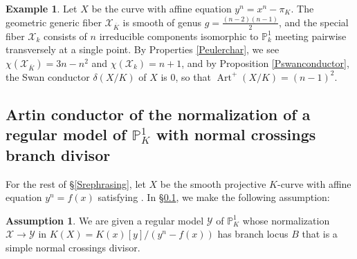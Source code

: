 \documentclass[12pt]{amsart}
\numberwithin{equation}{section}
\theoremstyle{definition}
\newtheorem{assumption}[equation]{Assumption}
\newtheorem{example}[equation]{Example}
\newcommand{\padma}[1]{{\color{Magenta} \sf $\clubsuit\clubsuit\clubsuit$ Padma: [#1]}}
\newcommand{\mc}[1]{\mathcal{#1}}
\renewcommand{\P}{\mathbb P}
\newcommand{\proj}{\mathbb P}
\renewcommand{\c}[1]{\overline{#1}}
\newcommand{\X}{\mathcal{X}}
\DeclareMathOperator{\Art}{Art}
\begin{document}

\begin{example}\label{example:optimal} Let $X$ be the curve with affine equation $y^n=x^n-\pi_K$. The geometric generic fiber $\X_{\c{K}}$ is smooth of genus $g=\frac{(n-2)(n-1)}{2}$, and the special fiber $\X_k$ consists of $n$ irreducible components isomorphic to $\P^1_k$ meeting pairwise transversely at a single point. By Properties \ref{Peulerchar}, we see $\chi(\X_{\c{K}})=3n-n^2$ and $\chi(\X_k)=n+1$, and by Proposition \ref{Pswanconductor}, the Swan conductor $\delta(X/K)$ of $X$ is $0$, so that $\Art^+(X/K)=(n-1)^2$. 
\end{example}


\subsection{Artin conductor of the normalization of a regular model of $\proj^1_K$
  with normal crossings branch divisor}\label{Sfirstartinformula}

For the rest of \S\ref{Srephrasing}, let $X$ be the smooth projective $K$-curve with affine
equation $y^n = f(x)$ satisfying .
In \S\ref{Sfirstartinformula}, we make the following assumption:

\begin{assumption}\label{Ahypoonmodel}
We are given a regular model $\mc{Y}$ of $\P^1_K$ whose normalization
$\mc{X} \to \mc{Y}$ in $K(X) = K(x)[y]/(y^n-f(x))$ has branch locus $B$ that
is a simple normal crossings divisor.
  \end{assumption}
 
\end{document}
